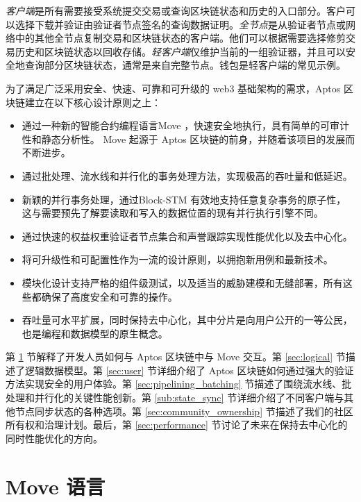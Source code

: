 \documentclass{article}
\begin{document}
\emph{客户端}是所有需要接受系统提交交易或查询区块链状态和历史的入口部分。客户可以选择下载并验证由验证者节点签名的查询数据证明。\emph{全节点}是从验证者节点或⽹络中的其他全节点复制交易和区块链状态的客户端。他们可以根据需要选择修剪交易历史和区块链状态以回收存储。\emph{轻客户端}仅维护当前的一组验证器，并且可以安全地查询部分区块链状态，通常是来⾃完整节点。钱包是轻客户端的常见⽰例。

为了满⾜⼴泛采⽤安全、快速、可靠和可升级的 web3 基础架构的需求，Aptos 区块链建⽴在以下核⼼设计原则之上：

\begin{itemize}
\item 通过一种新的智能合约编程语⾔Move \cite{move}，快速安全地执行，具有简单的可审计性和静态分析性。 Move 起源于 Aptos 区块链的前⾝，并随着该项⽬的发展⽽不断进步。 

\item 通过批处理、流水线和并行化的事务处理方法，实现极高的吞吐量和低延迟。

\item 新颖的并行事务处理，通过Block-STM 有效地⽀持任意复杂事务的原⼦性，这与需要预先了解要读取和写⼊的数据位置的现有并行执行引擎不同。

\item 通过快速的权益权重验证者节点集合和声誉跟踪实现性能优化以及去中心化。

\item 将可升级性和可配置性作为⼀流的设计原则，以拥抱新⽤例和最新技术。

\item 模块化设计支持严格的组件级测试，以及适当的威胁建模和无缝部署，所有这些都确保了⾼度安全和可靠的操作。 

\item 吞吐量可水平扩展，同时保持去中心化，其中分⽚是向⽤户公开的一等公民，也是编程和数据模型的原⽣概念。
\end{itemize}

第 \ref{sec:move} 节解释了开发⼈员如何与 Aptos 区块链中与 Move 交互。第 \ref{sec:logical} 节描述了逻辑数据模型。第 \ref{sec:user} 节详细介绍了 Aptos 区块链如何通过强⼤的验证⽅法实现安全的⽤户体验。第 \ref{sec:pipelining_batching} 节描述了围绕流⽔线、批处理和并行化的关键性能创新。第 \ref{sub:state_sync} 节详细介绍了不同客户端与其他节点同步状态的各种选项。第 \ref{sec:community_ownership} 节描述了我们的社区所有权和治理计划。最后，第 \ref{sec:performance} 节讨论了未来在保持去中⼼化的同时性能优化的⽅向。


\section{Move 语言}
\label{sec:move}
\end{document}
